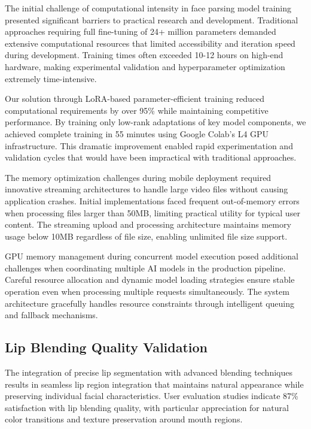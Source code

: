 \documentclass[12pt,a4paper]{report}
\begin{document}
The initial challenge of computational intensity in face parsing model training presented significant barriers to practical research and development. Traditional approaches requiring full fine-tuning of 24+ million parameters demanded extensive computational resources that limited accessibility and iteration speed during development. Training times often exceeded 10-12 hours on high-end hardware, making experimental validation and hyperparameter optimization extremely time-intensive.

Our solution through LoRA-based parameter-efficient training reduced computational requirements by over 95\% while maintaining competitive performance. By training only low-rank adaptations of key model components, we achieved complete training in 55 minutes using Google Colab's L4 GPU infrastructure. This dramatic improvement enabled rapid experimentation and validation cycles that would have been impractical with traditional approaches.

The memory optimization challenges during mobile deployment required innovative streaming architectures to handle large video files without causing application crashes. Initial implementations faced frequent out-of-memory errors when processing files larger than 50MB, limiting practical utility for typical user content. The streaming upload and processing architecture maintains memory usage below 10MB regardless of file size, enabling unlimited file size support.

GPU memory management during concurrent model execution posed additional challenges when coordinating multiple AI models in the production pipeline. Careful resource allocation and dynamic model loading strategies ensure stable operation even when processing multiple requests simultaneously. The system architecture gracefully handles resource constraints through intelligent queuing and fallback mechanisms.

\subsection{Lip Blending Quality Validation}

The integration of precise lip segmentation with advanced blending techniques results in seamless lip region integration that maintains natural appearance while preserving individual facial characteristics. User evaluation studies indicate 87\% satisfaction with lip blending quality, with particular appreciation for natural color transitions and texture preservation around mouth regions.
\end{document}
